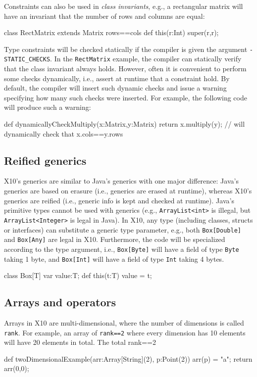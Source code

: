 \documentclass[a4paper]{article}
\def\codesmaller{\small}
\newcommand{\code}[1]{\texttt{\textup{\codesmaller #1}}}
\begin{document}
Constraints can also be used in \emph{class invariants},
    e.g., a rectangular matrix will have an invariant that the number of rows and columns are equal:
\begin{xten}
class RectMatrix extends Matrix {rows==cols} {
  def this(r:Int) {
    super(r,r);
  }
}
\end{xten}

Type constraints will be checked statically if the compiler is given the argument
    \code{-STATIC\_CHECKS}.
In the \code{RectMatrix} example, the compiler can statically verify that the class invariant always holds.
However, often it is convenient to perform some checks dynamically,
    i.e., assert at runtime that a constraint hold.
By default, the compiler will insert such dynamic checks and issue a warning specifying how many such checks were inserted.
For example, the following code will produce such a warning:
\begin{xten}
def dynamicallyCheckMultiply(x:Matrix,y:Matrix) {
  return x.multiply(y); // will dynamically check that x.cols==y.rows
}
\end{xten}


\subsection{Reified generics}
X10's generics are similar to Java's generics with one major difference:
    Java's generics are based on erasure (i.e., generics are erased at runtime),
    whereas X10's generics are reified (i.e., generic info is kept and checked at runtime).
Java's primitive types cannot be used with generics (e.g., \code{ArrayList<int>} is illegal, but \code{ArrayList<Integer>} is legal in Java).
In X10, any type (including classes, structs or interfaces) can substitute a generic type parameter,
    e.g., both \code{Box[Double]} and \code{Box[Any]} are legal in X10.
Furthermore, the code will be specialized according to the type argument,
    i.e., \code{Box[Byte]} will have a field of type \code{Byte} taking 1 byte,
    and \code{Box[Int]} will have a field of type \code{Int} taking 4 bytes.
\begin{xten}
class Box[T] {
  var value:T;
  def this(t:T) { value = t; }
}
\end{xten}


\subsection{Arrays and operators}
Arrays in X10 are multi-dimensional, where the number of dimensions is called \code{rank}.
For example, an array of \code{rank==2} where every dimension has 10 elements will have 20 elements in total.
The total
{rank==2}
\begin{xten}
def twoDimensionalExample(arr:Array[String](2), p:Point(2)) {
  arr(p) = "a";
  return arr(0,0);
}
\end{xten}
\end{document}
